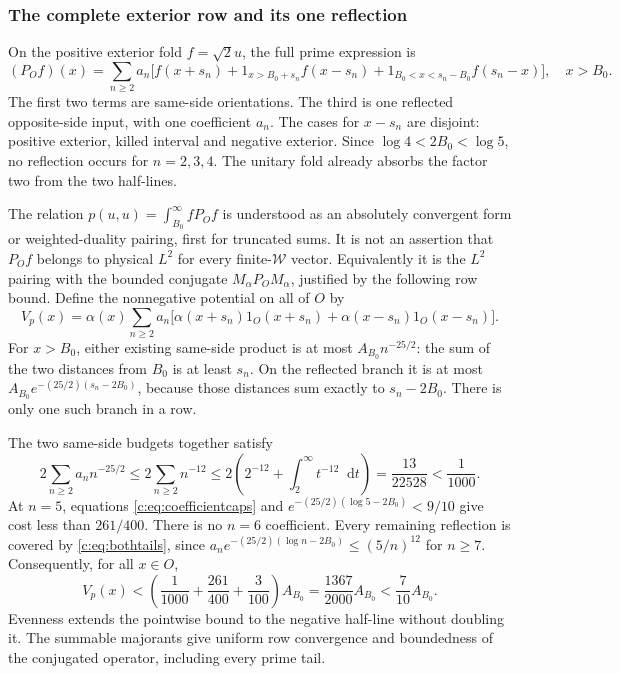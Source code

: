 \documentclass[11pt,a4paper]{article}
\numberwithin{equation}{section}
\theoremstyle{definition}\newtheorem{definition}[theorem]{Definition}
\theoremstyle{remark}\newtheorem{remark}[theorem]{Remark}
\newcommand{\dd}{\mathop{}\!\mathrm d}\newcommand{\one}{\mathbf1}
\newcommand{\PP}{P}\newcommand{\J}{J}\newcommand{\V}{V}\newcommand{\wo}{\mathcal W}
\begin{document}
\subsubsection{The complete exterior row and its one reflection}
On the positive exterior fold $f=\sqrt2u$, the full prime expression is
\begin{equation}\label{c:eq:exteriorfold}
 (\PP_Of)(x)=\sum_{n\ge2}a_n\big[
 f(x+s_n)+1_{x>{B_0}+s_n}f(x-s_n)
 +1_{{B_0}<x<s_n-{B_0}}f(s_n-x)\big],\quad x>{B_0}.
\end{equation}
The first two terms are same-side orientations. The third is one
reflected opposite-side input, with one coefficient $a_n$. The cases
for $x-s_n$ are disjoint: positive exterior, killed interval and
negative exterior. Since $\log4<2{B_0}<\log5$, no reflection occurs for
$n=2,3,4$. The unitary fold already absorbs the factor two from the
two half-lines.

The relation $p(u,u)=\int_{B_0}^\infty f\PP_Of$ is understood as an
absolutely convergent form or weighted-duality pairing, first for
truncated sums. It is not an assertion that $\PP_Of$ belongs to
physical $L^2$ for every finite-$\wo$ vector. Equivalently it is the
$L^2$ pairing with the bounded conjugate
$M_\alpha\PP_OM_\alpha$, justified by the following row bound.
Define the nonnegative potential on all of $O$ by
\begin{equation}\label{c:eq:primepotential}
 V_p(x)=\alpha(x)\sum_{n\ge2}a_n
 \big[\alpha(x+s_n)1_O(x+s_n)
      +\alpha(x-s_n)1_O(x-s_n)\big].
\end{equation}
For $x>{B_0}$, either existing same-side product is at most
$A_{B_0}n^{-25/2}$: the sum of the two distances from ${B_0}$ is at least
$s_n$. On the reflected branch it is at most
$A_{B_0}e^{-(25/2)(s_n-2{B_0})}$, because those distances sum exactly to
$s_n-2{B_0}$. There is only one such branch in a row.

The two same-side budgets together satisfy
\[
 2\sum_{n\ge2}a_nn^{-25/2}\le2\sum_{n\ge2}n^{-12}
 \le2\left(2^{-12}+\int_2^\infty t^{-12}\dd t\right)
 =\frac{13}{22528}<\frac1{1000}.
\]
At $n=5$, equations \eqref{c:eq:coefficientcaps} and
$e^{-(25/2)(\log5-2{B_0})}<9/10$ give cost less than $261/400$.
There is no $n=6$ coefficient. Every remaining reflection is covered by
\eqref{c:eq:bothtails}, since
$a_ne^{-(25/2)(\log n-2{B_0})}\le(5/n)^{12}$ for $n\ge7$.
Consequently, for all $x\in O$,
\begin{equation}\label{c:eq:primecap}
 V_p(x)<\left(\frac1{1000}+\frac{261}{400}+\frac3{100}\right)A_{B_0}
 =\frac{1367}{2000}A_{B_0}<\frac7{10}A_{B_0}.
\end{equation}
Evenness extends the pointwise bound to the negative half-line without
doubling it. The summable majorants give uniform row convergence and
boundedness of the conjugated operator, including every prime tail.
\end{document}
